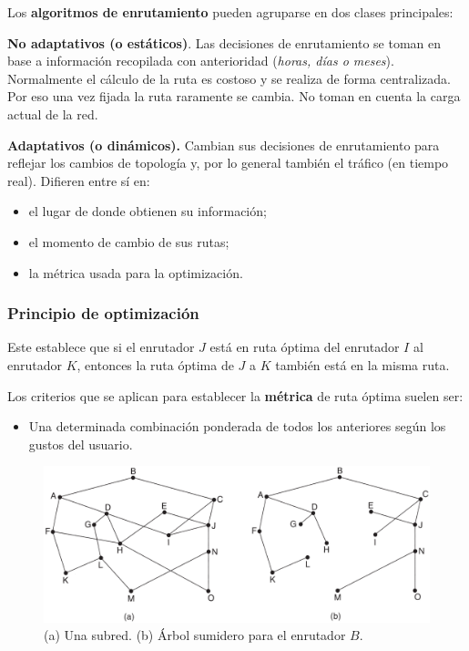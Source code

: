 \documentclass[10pt,a4paper]{article}
\begin{document}
Los \textbf{algoritmos de enrutamiento} pueden agruparse en dos clases principales:
\begin{description}
\item \textbf{No adaptativos (o estáticos)}. Las decisiones de enrutamiento se toman en base a información recopilada con anterioridad (\textit{horas, días o meses}). Normalmente el cálculo de la ruta es costoso y se realiza de forma centralizada. Por eso una vez fijada la ruta raramente se cambia. No toman en cuenta la carga actual de la red.
\item \textbf{Adaptativos (o dinámicos).} Cambian sus decisiones de enrutamiento para reflejar los cambios de topología y, por lo general también el tráfico (en tiempo real). Difieren entre sí en:
\begin{itemize}
\item el lugar de donde obtienen su información;
\item el momento de cambio de sus rutas;
\item la métrica usada para la optimización.
\end{itemize}
\end{description}

\subsubsection{Principio de optimización}

Este establece que si el enrutador $J$ está en ruta óptima del enrutador $I$ al enrutador $K$, entonces la ruta óptima de $J$ a $K$ también está en la misma ruta.

Los criterios que se aplican para establecer la \textbf{métrica} de ruta óptima suelen ser:

\begin{itemize}
\item Una determinada combinación ponderada de todos los anteriores según los gustos del usuario.
\end{itemize}

\begin{figure}
  \caption{(a) Una subred. (b) Árbol sumidero para el enrutador $B$.}
  \label{fig:sumidero}  
  \centering
  \hbox{\includegraphics[width=0.5\textwidth-\fboxrule-\fboxrule]{imgs/sumidero.png}}  
\end{figure}
\end{document}
